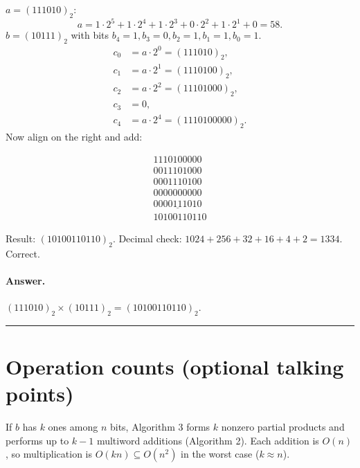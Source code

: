 \documentclass[12pt]{article}
\begin{document}
$a=(111010)_2$:
\[
a=1\cdot 2^5+1\cdot 2^4+1\cdot 2^3+0\cdot 2^2+1\cdot 2^1+0 = 58.
\]
$b=(10111)_2$ with bits $b_4=1,b_3=0,b_2=1,b_1=1,b_0=1$.
\[
\begin{aligned}
c_0 &= a\cdot 2^0 = (111010)_2,\\
c_1 &= a\cdot 2^1 = (1110100)_2,\\
c_2 &= a\cdot 2^2 = (11101000)_2,\\
c_3 &= 0,\\
c_4 &= a\cdot 2^4 = (1110100000)_2.
\end{aligned}
\]
Now align on the right and add:

\[
\begin{array}{r}
1110100000\\
0011101000\\
0001110100\\
0000000000\\
\underline{0000111010}\\ \hline
10100110110
\end{array}
\]

Result: $(10100110110)_2$.  
Decimal check: $1024+256+32+16+4+2=1334$. Correct.

\paragraph{Answer.} $(111010)_2\times(10111)_2=(10100110110)_2$.

\bigskip\hrule\bigskip

\section*{Operation counts (optional talking points)}
If $b$ has $k$ ones among $n$ bits, Algorithm 3 forms $k$ nonzero partial products and performs up to $k-1$ multiword additions (Algorithm 2). Each addition is $O(n)$, so multiplication is $O(kn)\subseteq O(n^2)$ in the worst case ($k\approx n$).
\end{document}
